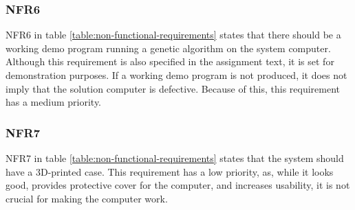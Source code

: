 \subsubsection{NFR6}

NFR6 in table \vref{table:non-functional-requirements} states that there should be a working demo program running a genetic algorithm on the system computer.
Although this requirement is also specified in the assignment text, it is set for demonstration purposes.
If a working demo program is not produced, it does not imply that the solution computer is defective.
Because of this, this requirement has a medium priority.

\subsubsection{NFR7}

NFR7 in table \vref{table:non-functional-requirements} states that the system should have a 3D-printed case.
This requirement has a low priority, as, while it looks good, provides protective cover for the computer, and increases usability, it is not crucial for making the computer work.

